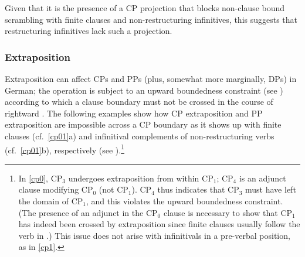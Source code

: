 \documentclass[output=paper]{langsci/langscibook}
\begin{document}
\ea\label{ex:2} 
    \z
\z

Given that it is the presence of a CP projection that blocks
non-clause bound scrambling with finite clauses and non-restructuring
infinitives, this suggests that restructuring infinitives lack such a
projection.

\subsubsection{\label{m3}Extraposition}

Extraposition can affect CPs and PPs (plus, somewhat more marginally, DPs) in
German; the operation is subject to an upward boundedness constraint (see
\citealt{Ross:67}) according to which a clause boundary must not be crossed in
the course of rightward . The following examples show how CP
extraposition and PP extraposition are impossible across a CP boundary as it
shows up with finite clauses (cf.\ \ref{cp01}a) and infinitival complements
of non-restructuring verbs (cf.\ \ref{cp01}b), respectively (see
\citealt{Mueller:96:ext}).\footnote{In \eqref{cp0}, CP$_3$ undergoes
    extraposition from within CP$_1$; CP$_4$ is an adjunct clause modifying
    CP$_0$ (not CP$_1$). CP$_4$ thus indicates that CP$_3$ must have left the
    domain of CP$_1$, and this violates the upward boundedness constraint. (The
    presence of an adjunct in the CP$_0$ clause is necessary to show that
    CP$_1$ has indeed been crossed by extraposition since finite clauses
usually follow the verb in .) This issue does not arise with infinitivals
in a pre-verbal position, as in \eqref{cp1}.}
\end{document}
